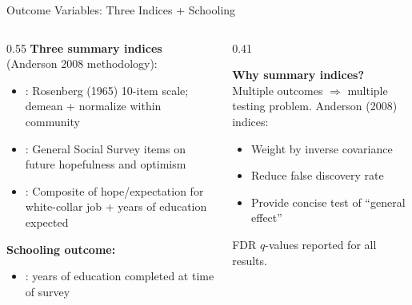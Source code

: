 \documentclass[aspectratio=169, 10pt]{beamer}
\begin{document}
\begin{frame}{Outcome Variables: Three Indices + Schooling}
  \begin{columns}
    \begin{column}{0.55\textwidth}
      \textbf{Three summary indices} (Anderson 2008 methodology):
      \begin{itemize}
        \item {}: Rosenberg (1965) 10-item scale; demean + normalize within community
        \item {}: General Social Survey items on future hopefulness and optimism
        \item {}: Composite of hope/expectation for white-collar job + years of education expected
      \end{itemize}
      \vspace{0.4em}
      \textbf{Schooling outcome:}
      \begin{itemize}
        \item {}: years of education completed at time of survey
      \end{itemize}
    \end{column}
    \begin{column}{0.41\textwidth}
      \begin{methodbox}
        \textbf{Why summary indices?}\\[0.3em]
        Multiple outcomes $\Rightarrow$ multiple testing problem. Anderson (2008) indices:
        \begin{itemize}\small
          \item Weight by inverse covariance
          \item Reduce false discovery rate
          \item Provide concise test of ``general effect''
        \end{itemize}
        \vspace{0.2em}
        FDR $q$-values reported for all results.
      \end{methodbox}
    \end{column}
  \end{columns}
\end{frame}
\end{document}
